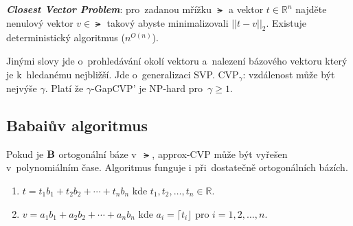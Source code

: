 \textbf{\emph{Closest Vector Problem}}: pro~zadanou mřížku $\lat$ a vektor $t \in \mathbb{R}^n$ najděte nenulový vektor $v \in \lat$ takový abyste minimalizovali $||t - v||_2$.
Existuje deterministický algoritmus ($n^{O(n)}$)\footnotemark{}.

Jinými slovy jde o~prohledávání okolí vektoru a~nalezení bázového vektoru který je k~hledanému nejbližší.
Jde o~generalizaci SVP.
CVP$_\gamma$: vzdálenost může být nejvýše $\gamma$.
Platí že $\gamma$-GapCVP' je NP-hard pro~$\gamma \ge 1$\footnotemark{}.


\subsection{Babaiův algoritmus}

Pokud je $\text{\textbf{B}}$ ortogonální báze v~$\lat$, approx-CVP může být vyřešen v~polynomiálním čase.
Algoritmus funguje i při~dostatečně ortogonálních bázích.

\begin{enumerate}
\item $t = t_1 b_1 + t_2 b_2 + \cdots + t_n b_n$ kde $t_1, t_2, \dots, t_n \in \mathbb{R}$.
\item $v = a_1 b_1 + a_2 b_2 + \cdots + a_n b_n$ kde $a_i = \lceil t_i \rfloor$ pro $i = 1, 2, \dots, n$.
\end{enumerate}


